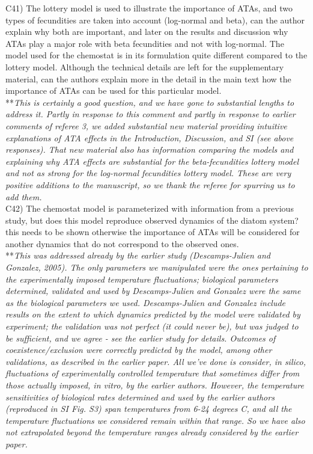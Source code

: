 \documentclass[letterpaper,11pt]{article}
\begin{document}
\noindent C41) The lottery model is used to illustrate the importance of ATAs, and two types of fecundities are taken 
into account (log-normal and beta), can the author explain why both are important, and later on the results and discussion 
why ATAs play a major role with beta fecundities and not with log-normal.
The model used for the chemostat is in its formulation quite different compared to the lottery model. Although the technical
details are left for the supplementary material, can the authors explain more in the detail in the main text how the 
importance of ATAs can be used for this particular model.\\

\noindent ***\emph{This is certainly a good question, and we have gone to substantial lengths to address it. 
Partly in response to this comment and partly in response to earlier comments of referee 3, 
we added substantial new material providing intuitive explanations of ATA effects in the Introduction,
Discussion, and SI (see above responses). That new material also has information comparing the models
and explaining why ATA effects are substantial for the beta-fecundities lottery model and not as strong
for the log-normal fecundities lottery model. These are very positive additions to the manuscript, so we 
thank the referee for spurring us to add them. } \\

\noindent C42) The chemostat model is parameterized with information from a previous study, but does this model reproduce observed dynamics of the diatom system? this needs to be shown otherwise the importance of ATAs will be considered for another dynamics that do not correspond to the observed ones. \\

\noindent ***\emph{This was addressed already by the earlier study (Descamps-Julien and Gonzalez, 2005). 
The only parameters we manipulated were the ones pertaining
to the experimentally imposed temperature fluctuations; biological parameters determined, validated and used by Descamps-Julien and Gonzalez
were the same as the biological parameters we used. Descamps-Julien and Gonzalez include results on the extent to
which dynamics predicted by the model were validated by experiment; the validation was not perfect (it could
never be), but was judged to be sufficient, and we agree - see the earlier study for details. 
Outcomes of coexistence/exclusion were 
correctly predicted by the model, among other validations, as described in the earlier paper. 
All we've done is consider, in silico, fluctuations of 
experimentally controlled temperature that sometimes
differ from those actually imposed, in vitro, by the earlier authors. However, the temperature sensitivities of 
biological rates determined and used by the earlier authors (reproduced in SI Fig. S3) span temperatures from 
6-24 degrees C, and all the temperature fluctuations we considered remain within that range. So we
have also not extrapolated beyond the temperature ranges already considered by the earlier paper.} \\
\end{document}
